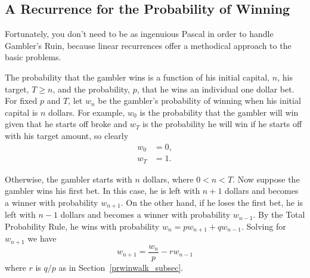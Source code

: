\subsection{A Recurrence for the Probability of Winning}

Fortunately, you don't need to be as ingenuious Pascal in order to
handle Gambler's Ruin, because linear recurrences offer a methodical
approach to the basic problems.

The probability that the gambler wins is a function of his initial
capital, $n$, his target, $T \geq n$, and the probability, $p$, that
he wins an individual one dollar bet.  For fixed $p$ and $T$, let
$w_n$ be the gambler's probability of winning when his initial
capital is $n$ dollars.  For example, $w_0$ is the probability that
the gambler will win given that he starts off broke and $w_T$ is the
probability he will win if he starts off with his target amount, so
clearly
\begin{align}
w_0 & = 0,\label{LN12:w0}\\
w_T & = 1. \label{LN12:wT}
\end{align}

Otherwise, the gambler starts with $n$ dollars, where $0 < n < T$.
Now suppose the gambler wins his first bet.  In this case, he is left
with $n+1$ dollars and becomes a winner with probability $w_{n+1}$.
On the other hand, if he loses the first bet, he is left with $n-1$
dollars and becomes a winner with probability $w_{n-1}$.  By the Total
Probability Rule, he wins with probability $w_n = p w_{n+1} + q
w_{n-1}$.  Solving for $w_{n+1}$ we have
\begin{equation}\label{LN12:rec1}
w_{n+1} = \frac{w_n}{p} - r w_{n-1}
\end{equation}
where $r$ is $q/p$ as in Section~\ref{prwinwalk_subsec}.

